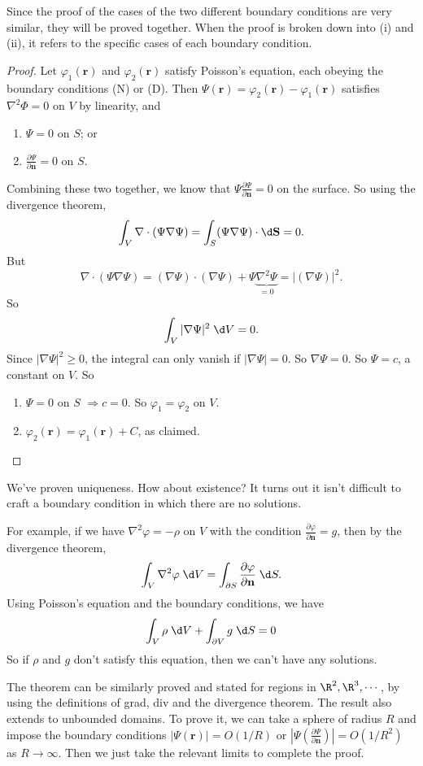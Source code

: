 \documentclass[a4paper]{article}
\begin{document}
Since the proof of the cases of the two different boundary conditions are very similar, they will be proved together. When the proof is broken down into (i) and (ii), it refers to the specific cases of each boundary condition.
\begin{proof}
  Let $\varphi_1(\mathbf{r})$ and $\varphi_2(\mathbf{r})$ satisfy Poisson's equation, each obeying the boundary conditions (N) or (D). Then $\Psi(\mathbf{r}) = \varphi_2(\mathbf{r}) - \varphi_1(\mathbf{r})$ satisfies $\nabla^2\Phi = 0$ on $V$ by linearity, and
  \begin{enumerate}
    \item $\Psi = 0$ on $S$; or
    \item $\frac{\partial \Psi}{\partial \mathbf{n}} = 0$ on $S$.
  \end{enumerate}
  Combining these two together, we know that $\Psi\frac{\partial \Psi}{\partial \mathbf{n}} = 0$ on the surface. So using the divergence theorem,
  \[
    \int_V \nabla\cdot (\Psi\nabla \Psi) = \int_S (\Psi\nabla\Psi)\cdot \d \mathbf{S} = 0.
  \]
  But
  \[
    \nabla\cdot(\Psi\nabla \Psi) = (\nabla\Psi)\cdot (\nabla\Psi) + \Psi\underbrace{\nabla^2\Psi}_{=0} = |(\nabla\Psi)|^2.
  \]
  So
  \[
    \int_V |\nabla \Psi|^2\;\d V = 0.
  \]
  Since $|\nabla\Psi|^2 \geq 0$, the integral can only vanish if $|\nabla \Psi| = 0$. So $\nabla\Psi = 0$. So $\Psi = c$, a constant on $V$. So
  \begin{enumerate}
    \item $\Psi = 0$ on $S$ $\Rightarrow c = 0$. So $\varphi_1 = \varphi_2$ on $V$.
    \item $\varphi_2(\mathbf{r}) = \varphi_1(\mathbf{r}) + C$, as claimed.
  \end{enumerate}
\end{proof}
We've proven uniqueness. How about existence? It turns out it isn't difficult to craft a boundary condition in which there are no solutions.

For example, if we have $\nabla^2 \varphi = -\rho$ on $V$ with the condition $\frac{\partial \varphi}{\partial \mathbf{n}} = g$, then by the divergence theorem,
\[
  \int_V \nabla^2\varphi \;\d V = \int_{\partial S} \frac{\partial \varphi}{\partial \mathbf{n}}\;\d S.
\]
Using Poisson's equation and the boundary conditions, we have
\[
  \int_V \rho \;\d V + \int_{\partial V} g\;\d S = 0
\]
So if $\rho$ and $g$ don't satisfy this equation, then we can't have any solutions.

\note The theorem can be similarly proved and stated for regions in $\R^2, \R^3, \cdots$, by using the definitions of grad, div and the divergence theorem. The result also extends to unbounded domains. To prove it, we can take a sphere of radius $R$ and impose the boundary conditions $|\Psi(\mathbf{r})| = O(1/R)$ or $|\Psi(\frac{\partial \Psi}{\partial \mathbf{n}})| = O(1/R^2)$ as $R\to \infty$. Then we just take the relevant limits to complete the proof.
\end{document}
